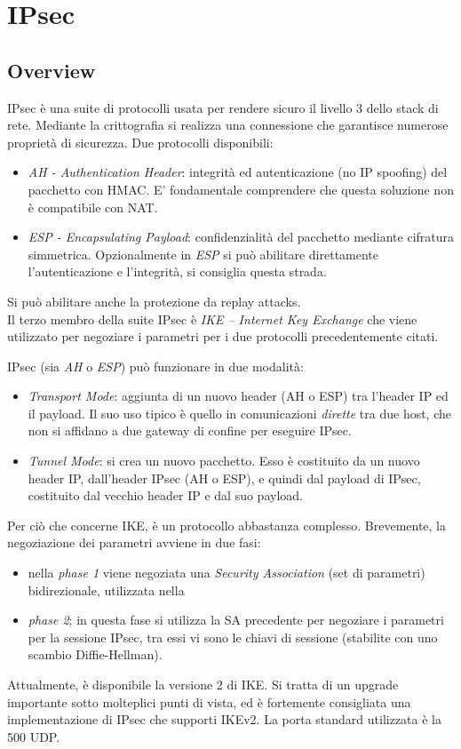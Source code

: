 \section{IPsec}
\subsection{Overview}
IPsec è una suite di protocolli usata per rendere sicuro il livello 3 dello stack di
rete. Mediante la crittografia si realizza una connessione che garantisce
numerose proprietà di sicurezza. Due protocolli disponibili:
\begin{itemize}
  \item \textit{AH - Authentication Header}: integrità ed autenticazione (no IP spoofing) del pacchetto con HMAC.
  E' fondamentale comprendere che questa soluzione non è compatibile con NAT.
  \item \textit{ESP - Encapsulating Payload}: confidenzialità del pacchetto mediante cifratura simmetrica.
  Opzionalmente in \textit{ESP} si può abilitare direttamente l'autenticazione e l'integrità,
  si consiglia questa strada.
\end{itemize}
Si può abilitare anche la protezione da replay attacks.\\

Il terzo membro della suite IPsec è \textit{IKE -- Internet Key Exchange} che viene
utilizzato per negoziare i parametri per i due protocolli precedentemente citati.

IPsec (sia \textit{AH} o \textit{ESP}) può funzionare in due modalità:
\begin{itemize}
  \item \textit{Transport Mode}: aggiunta di un nuovo header (AH o ESP) tra l'header IP
  ed il payload.
  Il suo uso tipico è quello in comunicazioni \textit{dirette} tra due host, che non si affidano a
  due gateway di confine per eseguire IPsec.
  \item \textit{Tunnel Mode}: si crea un nuovo pacchetto. Esso è costituito da
  un nuovo header IP, dall'header IPsec (AH o ESP), e quindi dal payload di IPsec, costituito dal
  vecchio header IP e dal suo payload.
\end{itemize}

Per ciò che concerne IKE, è un protocollo abbastanza complesso. Brevemente, la negoziazione
dei parametri avviene in due fasi:
\begin{itemize}
  \item nella \textit{phase 1} viene negoziata una \textit{Security Association} (set di parametri)
  bidirezionale, utilizzata nella
  \item \textit{phase 2}; in questa fase si utilizza la SA precedente per negoziare i
  parametri per la sessione IPsec, tra essi vi sono le chiavi di sessione (stabilite con
  uno scambio Diffie-Hellman).
\end{itemize}
Attualmente, è disponibile la versione 2 di IKE. Si tratta di un upgrade importante sotto molteplici punti
di vista, ed è fortemente consigliata una implementazione di IPsec che supporti IKEv2.
La porta standard utilizzata è la 500 UDP.


